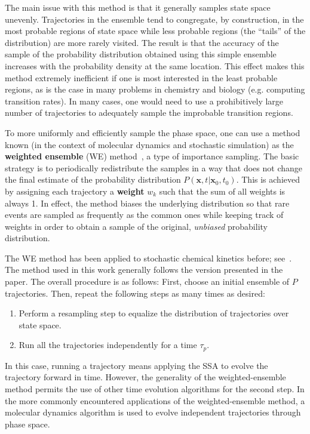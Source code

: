 \documentclass[english,letterpaper,12pt]{report}
\newcommand{\defkeywd}[1]{\textbf{#1}}
\renewcommand{\vec}[1]{\ensuremath{\mathbf{#1}}}
\begin{document}
\begin{doublespacing}
The main issue with this method is that it generally samples state space unevenly. Trajectories in the ensemble tend to congregate, by construction, in the most probable regions of state space while less probable regions (the ``tails'' of the distribution) are more rarely visited. The result is that the accuracy of the sample of the probability distribution obtained using this simple ensemble increases with the probability density at the same location. This effect makes this method extremely inefficient if one is most interested in the least probable regions, as is the case in many problems in chemistry and biology (e.g. computing transition rates).
In many cases,  one would need to use a prohibitively large number of trajectories to adequately sample the improbable transition regions.


To more uniformly and efficiently sample the phase space, one can use a method known (in the context of molecular dynamics and stochastic simulation) as the \defkeywd{weighted ensemble} (WE) method~\cite{we-orig}, a type of importance sampling. The basic strategy is to periodically redistribute the samples in a way that does not change the final estimate of the probability distribution $P(\vec{x}, t | \vec{x}_0, t_0)$. This is achieved by assigning each trajectory a \defkeywd{weight} $w_k$ such that the sum of all weights is always 1. In effect, the method biases the underlying distribution so that rare events are sampled as frequently as the common ones while keeping track of weights in order to obtain a sample of the original, \emph{unbiased} probability distribution.

The WE method has been applied to stochastic chemical kinetics before; see~\cite{we-chemkin}. The method used in this work generally follows the version presented in the paper. The overall procedure is as follows: First, choose an initial ensemble of $P$ trajectories. Then, repeat the following steps as many times as desired:
\begin{enumerate}
    \item Perform a resampling step to equalize the distribution of trajectories over state space.
    \item Run all the trajectories independently for a time $\tau_p$.
\end{enumerate}
In this case, running a trajectory means applying the SSA to evolve the trajectory forward in time. However, the generality of the weighted-ensemble method permits the use of other time evolution algorithms for the second step. In the more commonly encountered applications of the weighted-ensemble method, a molecular dynamics algorithm is used to evolve independent trajectories through phase space.


\end{doublespacing}
\end{document}
